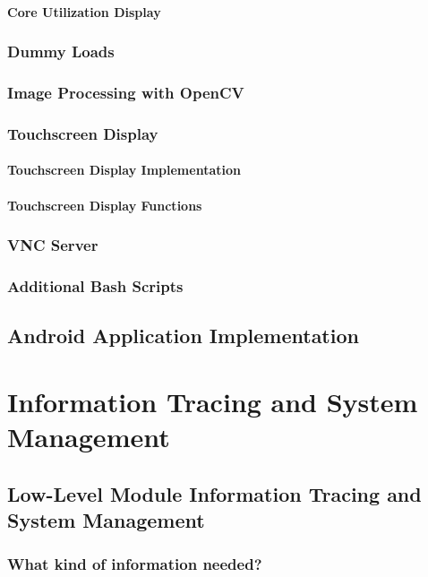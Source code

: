 \subsubsection{Core Utilization Display}
\subsection{Dummy Loads}
\subsection{Image Processing with OpenCV}
\subsection{Touchscreen Display}
\subsubsection{Touchscreen Display Implementation}
\subsubsection{Touchscreen Display Functions}
\subsection{VNC Server}
\subsection{Additional Bash Scripts}
\section{Android Application Implementation}
\chapter{Information Tracing and System Management}
\section{Low-Level Module Information Tracing and System Management}
\subsection{What kind of information needed?}
